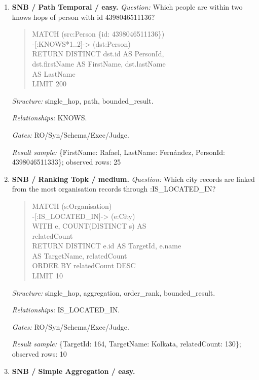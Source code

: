 \begin{enumerate}
\textit{Gates:} RO/Syn/Schema/Exec/Judge.\par
\textit{Result sample:} \{PersonFirstName: R., PersonId: 8796093022313, PersonLastName: Rao\}; observed rows: 25
\item \textbf{SNB / Path Temporal / easy.}
\textit{Question:} Which people are within two knows hops of person with id 4398046511136?
\begin{quote}\scriptsize\ttfamily\raggedright\sloppy
MATCH (src:Person \{id: 4398046511136\})\\
-[:KNOWS*1..2]-\textgreater{} (dst:Person)\\
RETURN DISTINCT dst.id AS PersonId,\\
dst.firstName AS FirstName, dst.lastName\\
AS LastName\\
LIMIT 200
\end{quote}
\textit{Structure:} single\_hop, path, bounded\_result.\par
\textit{Relationships:} KNOWS.\par
\textit{Gates:} RO/Syn/Schema/Exec/Judge.\par
\textit{Result sample:} \{FirstName: Rafael, LastName: Fernández, PersonId: 4398046511333\}; observed rows: 25
\item \textbf{SNB / Ranking Topk / medium.}
\textit{Question:} Which city records are linked from the most organisation records through :IS\_LOCATED\_IN?
\begin{quote}\scriptsize\ttfamily\raggedright\sloppy
MATCH (s:Organisation)\\
-[:IS\_LOCATED\_IN]-\textgreater{} (e:City)\\
WITH e, COUNT(DISTINCT s) AS\\
relatedCount\\
RETURN DISTINCT e.id AS TargetId, e.name\\
AS TargetName, relatedCount\\
ORDER BY relatedCount DESC\\
LIMIT 10
\end{quote}
\textit{Structure:} single\_hop, aggregation, order\_rank, bounded\_result.\par
\textit{Relationships:} IS\_LOCATED\_IN.\par
\textit{Gates:} RO/Syn/Schema/Exec/Judge.\par
\textit{Result sample:} \{TargetId: 164, TargetName: Kolkata, relatedCount: 130\}; observed rows: 10
\item \textbf{SNB / Simple Aggregation / easy.}

\end{enumerate}
